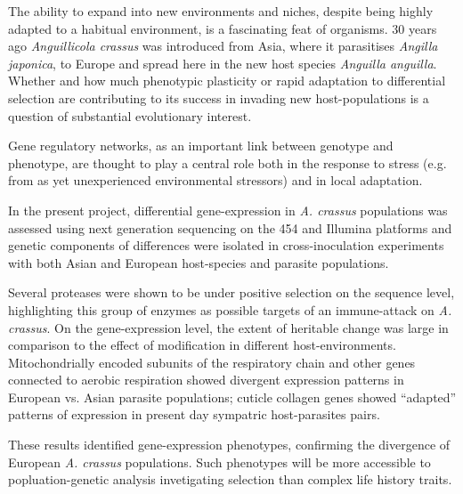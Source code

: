 


\begin{abstractslong}        %

  The ability to expand into new environments and niches, despite
  being highly adapted to a habitual environment, is a fascinating
  feat of organisms. 30 years ago \textit{Anguillicola crassus} was
  introduced from Asia, where it parasitises \textit{Angilla
    japonica}, to Europe and spread here in the new host species
  \textit{Anguilla anguilla}. Whether and how much phenotypic
  plasticity or rapid adaptation to differential selection are
  contributing to its success in invading new host-populations is a
  question of substantial evolutionary interest.

  Gene regulatory networks, as an important link between genotype
  and phenotype, are thought to play a central role both in the
  response to stress (e.g. from as yet unexperienced environmental
  stressors) and in local adaptation.

  In the present project, differential gene-expression in
  \textit{A. crassus} populations was assessed using next generation
  sequencing on the 454 and Illumina platforms and genetic components
  of differences were isolated in cross-inoculation experiments with
  both Asian and European host-species and parasite populations.

  Several proteases were shown to be under positive selection on the
  sequence level, highlighting this group of enzymes as possible
  targets of an immune-attack on \textit{A. crassus}. On the
  gene-expression level, the extent of heritable change was large in
  comparison to the effect of modification in different
  host-environments. Mitochondrially encoded subunits of the
  respiratory chain and other genes connected to aerobic respiration
  showed divergent expression patterns in European vs. Asian parasite
  populations; cuticle collagen genes showed ``adapted'' patterns of
  expression in present day sympatric host-parasites pairs.
  
  These results identified gene-expression phenotypes, confirming the
  divergence of European \textit{A. crassus} populations. Such
  phenotypes will be more accessible to popluation-genetic analysis
  invetigating selection than complex life history traits.

\end{abstractslong}



     